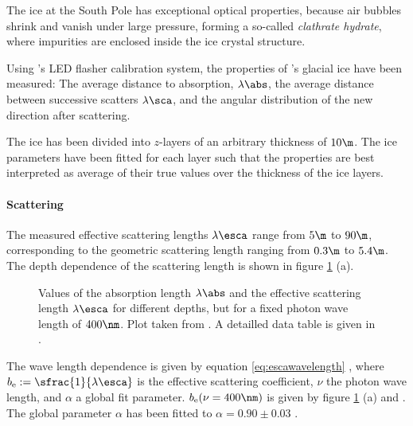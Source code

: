 The ice at the South Pole has exceptional optical properties, because air bubbles shrink and vanish under large pressure, forming a so-called \textit{clathrate hydrate}, where impurities are enclosed inside the ice crystal structure. \cite{rongenswedishcamera}

Using \icecube's LED flasher calibration system, the properties of \icecube's glacial ice have been measured: The average distance to absorption, $\lambda\abs$, the average distance between successive scatters $\lambda\sca$, and the angular distribution of the new direction after scattering. \cite{icepaper}

The ice has been divided into $z$-layers of an arbitrary thickness of $10\m$. The ice parameters have been fitted for each layer such that the properties are best interpreted as average of their true values over the thickness of the ice layers. \cite{icepaper}


\paragraph{Scattering}
The measured effective scattering lengths $\lambda\esca$ range from $5\m$ to $90\m$, corresponding to the geometric scattering length ranging from $0.3\m$ to $5.4\m$. The depth dependence of the scattering length is shown in figure \ref{fig:Ahxobai3} (a). \cite{icepaper}

\begin{figure}[htbp]
  \hfill
  \caption{Values of the absorption length $\lambda\abs$ and the effective scattering length $\lambda\esca$ for different depths, but for a fixed photon wave length of $400\nm$. Plot taken from \cite[figure 16]{icepaper}. A detailled data table is given in \cite[table C1]{icepaper}.}
  \label{fig:Ahxobai3}
\end{figure}


The wave length dependence is given by equation \ref{eq:escawavelength} \cite[section 4]{icepaper}, where $b_\text{e} := \sfrac{1}{\lambda\esca}$ is the effective scattering coefficient, $\nu$ the photon wave length, and $\alpha$ a global fit parameter. $b_\text{e}(\nu = 400\nm)$ is given by figure \ref{fig:Ahxobai3} (a) and \cite[table C4]{icepaper}. The global parameter $\alpha$ has been fitted to $\alpha = 0.90 \pm 0.03$ \cite[section 5.1]{ackermann}.

